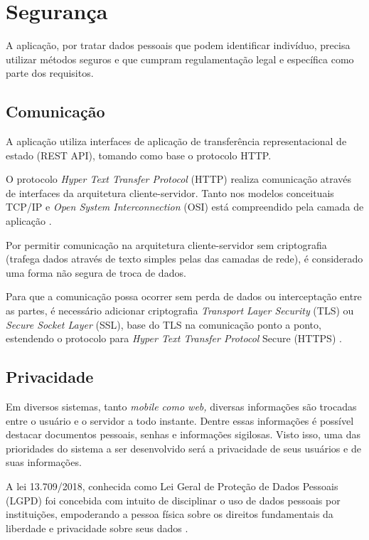 \documentclass[
    12pt,               %
    openright,          %
    oneside,
    a4paper,            %
    BIBLATEX,           %
    TODO,               %
    english,            %
    brazil              %
    ]{ifsp-spo-inf-ctds}
\begin{document}
    \section{Segurança}

        A aplicação, por tratar dados pessoais que podem identificar indivíduo, precisa utilizar métodos seguros e que cumpram regulamentação legal e específica como parte dos requisitos.

        \subsection{Comunicação}

            A aplicação utiliza interfaces de aplicação de transferência representacional de estado (REST API), tomando como base o protocolo HTTP.

            O protocolo \emph{Hyper Text Transfer Protocol} (HTTP) realiza comunicação através de interfaces da arquitetura cliente-servidor. Tanto nos modelos conceituais TCP/IP e \emph{Open System Interconnection} (OSI) está compreendido pela camada de aplicação .

            Por permitir comunicação na arquitetura cliente-servidor sem criptografia (trafega dados através de texto simples pelas das camadas de rede), é considerado uma forma não segura de troca de dados.

            Para que a comunicação possa ocorrer sem perda de dados ou interceptação entre as partes, é necessário adicionar criptografia \emph{Transport Layer Security} (TLS) ou \emph{Secure Socket Layer} (SSL), base do TLS na comunicação ponto a ponto, estendendo o protocolo para \emph{Hyper Text Transfer Protocol} Secure (HTTPS) .

        \subsection{Privacidade}

            Em diversos sistemas, tanto \emph{mobile como web,} diversas informações são trocadas entre o usuário e o servidor a todo instante. Dentre essas informações é possível destacar documentos pessoais, senhas e informações sigilosas. Visto isso, uma das prioridades do sistema a ser desenvolvido será a privacidade de seus usuários e de suas informações.

            A lei 13.709/2018, conhecida como Lei Geral de Proteção de Dados Pessoais (LGPD) foi concebida com intuito de disciplinar o uso de dados pessoais por instituições, empoderando a pessoa física sobre os direitos fundamentais da liberdade e privacidade sobre seus dados .
\end{document}
